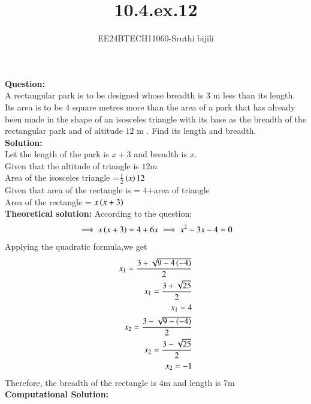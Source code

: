 \documentclass[journal]{IEEEtran}
\begin{document}

\vspace{3cm}

\title{10.4.ex.12}
\author{EE24BTECH11060-Sruthi bijili}
{\let\newpage\relax\maketitle}
\textbf{Question:}\\
A rectangular park is to be designed whose breadth is $3$ m less than its length. Its area is to be $4$ square metres more than the area of a park that has already been made in the shape of an isosceles triangle with its base as the breadth of the rectangular park and of altitude $12$ m . Find its length and breadth.\\
\textbf{Solution:}\\
Let the length of the park is $x+3$ and breadth is $x$.\\
Given that the altitude of triangle is $12m$\\ 
Area of the isosceles triangle =$\frac{1}{2}\left(x\right)12$\\
Given that area of the rectangle is = 4+area of triangle\\
Area of the rectangle = $x\left(x+3\right)$\\
\textbf{Theoretical solution:}
According to the question:\\
\begin{align}
    \implies x\left(x+3\right)=4+6x
    \implies x^2-3x-4=0
\end{align}
Applying the quadratic formula,we get
\begin{align}
    x_1=\frac{3+\sqrt{9-4\left(-4\right)}}{2}\\
    x_1=\frac{3+\sqrt{25}}{2}\\
    x_1=4\\
    x_2=\frac{3-\sqrt{9-\left(-4\right)}}{2}\\
    x_2=\frac{3-\sqrt{25}}{2}\\
    x_2=-1
\end{align}
Therefore, the breadth of the rectangle is $4$m and length is $7$m\\
\textbf{Computational Solution:}
\end{document}

